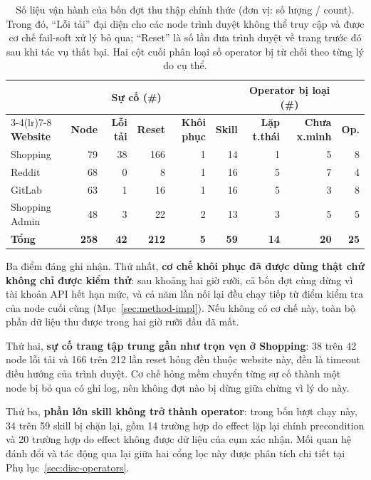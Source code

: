 \begin{table}[H]
\centering
\caption[Số liệu vận hành của bốn đợt thu thập]{Số liệu vận hành của bốn đợt thu thập chính thức (đơn vị: số lượng / count). Trong đó, ``Lỗi tải'' đại diện cho các node trình duyệt không thể truy cập và được cơ chế fail-soft xử lý bỏ qua; ``Reset'' là số lần đưa trình duyệt về trang trước đó sau khi tác vụ thất bại. Hai cột cuối phân loại số operator bị từ chối theo từng lý do cụ thể.}
\label{tab:app-runs-final}
\footnotesize
\setlength{\tabcolsep}{3.5pt}
\begin{tabular}{@{}lrrrrrrrr@{}}
\toprule
& & \multicolumn{2}{c}{\textbf{Sự cố (\#)}} & & & \multicolumn{2}{c}{\textbf{Operator bị loại (\#)}} & \\
\cmidrule(lr){3-4}\cmidrule(lr){7-8}
\textbf{Website} & \textbf{Node} & \textbf{Lỗi tải} & \textbf{Reset} & \textbf{Khôi phục} & \textbf{Skill} & \textbf{Lặp t.thái} & \textbf{Chưa x.minh} & \textbf{Op.} \\
\midrule
Shopping       & 79 & 38 & 166 & 1 & 14 &  1 &  5 &  8 \\
Reddit         & 68 &  0 &   8 & 1 & 16 &  5 &  7 &  4 \\
GitLab         & 63 &  1 &  16 & 1 & 16 &  5 &  3 &  8 \\
Shopping Admin & 48 &  3 &  22 & 2 & 13 &  3 &  5 &  5 \\
\midrule
\textbf{Tổng} & \textbf{258} & \textbf{42} & \textbf{212} & \textbf{5} &
\textbf{59} & \textbf{14} & \textbf{20} & \textbf{25} \\
\bottomrule
\end{tabular}
\end{table}

\noindent
Ba điểm đáng ghi nhận. Thứ nhất, \textbf{cơ chế khôi phục đã được dùng thật
chứ không chỉ được kiểm thử}: sau khoảng hai giờ rưỡi, cả bốn đợt cùng dừng
vì tài khoản API hết hạn mức, và cả năm lần nối lại đều chạy tiếp từ điểm
kiểm tra của node cuối cùng (Mục~\ref{sec:method-impl}). Nếu không có cơ chế
này, toàn bộ phần dữ liệu thu được trong hai giờ rưỡi đầu đã mất.

Thứ hai, \textbf{sự cố trang tập trung gần như trọn vẹn ở Shopping}: 38 trên
42 node lỗi tải và 166 trên 212 lần reset hỏng đều thuộc website này, đều là
timeout điều hướng của trình duyệt. Cơ chế hỏng mềm chuyển từng sự cố thành
một node bị bỏ qua có ghi log, nên không đợt nào bị dừng giữa chừng vì lý do
này.

Thứ ba, \textbf{phần lớn skill không trở thành operator}: trong bốn lượt chạy này, 34 trên 59 skill
bị chặn lại, gồm 14 trường hợp do effect lặp lại chính precondition và 20 trường
hợp do effect không được dữ liệu của cụm xác nhận. Mối quan hệ đánh đổi và
tác động qua lại giữa hai cổng lọc này được phân tích chi tiết tại
Phụ lục~\ref{sec:disc-operators}.


